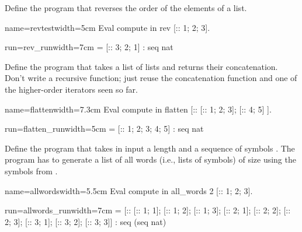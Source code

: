 \begin{Exercise}[label=ex:rev,difficulty=0,title={List reversal}]
Define the program  that reverses the order of the elements
of a list.

\begin{coq}{name=revtest}{width=5cm}
Eval compute in
  rev [:: 1; 2; 3].
\end{coq}
\begin{coqout}{run=rev_run}{width=7cm}
 = [:: 3; 2; 1]
 : seq nat
\end{coqout}
\end{Exercise}

\begin{Exercise}[label=ex:flatten,difficulty=1,title={List flattening}]
Define the program  that takes a list of lists and returns
their concatenation.  Don't write a recursive function; just reuse
the concatenation function and one of the higher-order iterators
seen so far.

\begin{coq}{name=flatten}{width=7.3cm}
Eval compute in
  flatten [:: [:: 1; 2; 3]; [:: 4; 5] ].
\end{coq}
\begin{coqout}{run=flatten_run}{width=5cm}
 = [:: 1; 2; 3; 4; 5]
 : seq nat
\end{coqout}
\end{Exercise}


\begin{Exercise}[label=ex:allwords,difficulty=2,title={All words of size n}]
Define the  program that takes in input a
length  and a sequence of symbols .
The program has to generate a list of all words (i.e., lists
of symbols) of size  using the symbols from .

\begin{coq}{name=allwords}{width=5.5cm}
Eval compute in
  all_words 2 [:: 1; 2; 3].
$~$
$~$
\end{coq}
\begin{coqout}{run=allwords_run}{width=7cm}
 = [:: [:: 1; 1]; [:: 1; 2]; [:: 1; 3];
       [:: 2; 1]; [:: 2; 2]; [:: 2; 3];
       [:: 3; 1]; [:: 3; 2]; [:: 3; 3]]
 : seq (seq nat)
\end{coqout}
\end{Exercise}


